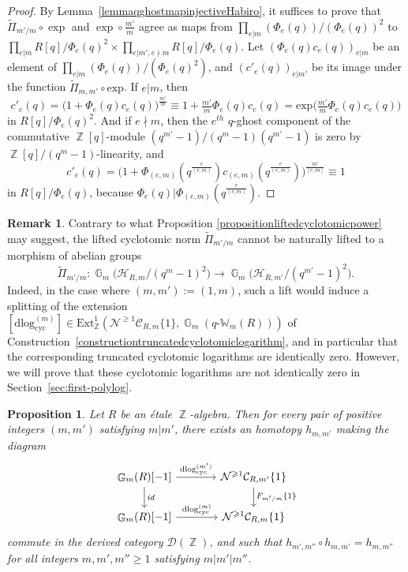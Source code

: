 \documentclass[10pt,twoside]{scrarticle}
\newlength{\mar} \setlength{\mar}{1cm}%
\newlength{\len}
\newtheorem{proposition}[theorem]{Proposition}
\theoremstyle{definition}
\newtheorem{remark}[theorem]{Remark}
\DeclareMathOperator{\Z}{\mathbb{Z}}
\DeclareMathOperator{\G}{\mathbb{G}}
\newcommand{\CRm}{\mathcal{C}_{R,m}}
\newcommand{\Cyc}{\mathrm{cyc}}
\newcommand{\qWm}{q\text{-}\mathbb{W}_m}
\renewcommand{\ge}{\geqslant}
\newcommand{\dlog}{\mathrm{dlog}}
\numberwithin{equation}{theorem}
\begin{document}
\begin{proof}
    By Lemma~\ref{lemmaqghostmapinjectiveHabiro}, it suffices to prove that $\tilde{\Pi}_{m'/m}\circ \exp$ and $\exp\circ \frac{m'}{m}$ agree as maps from $\prod_{e|m}{(\Phi_e(q))/(\Phi_e(q))^2}$ to $\prod_{e|m} R[q]/\Phi_e(q)^2 \times \prod_{e|m',e \nmid m} R[q]/\Phi_e(q)$. 
    Let $(\Phi_e(q)c_e(q))_{e|m}$ be an element of $\prod_{e|m}{(\Phi_e(q))/(\Phi_e(q)^2)}$, and $(c'_e(q))_{e|m'}$ be its image under the function $\tilde{\Pi}_{m,m'} \circ \text{exp}$. If $e|m$, then 
    $$c'_e(q) = \big(1+\Phi_e(q)c_e(q)\big)^{\frac{m'}{m}} \equiv 1 + \tfrac{m'}{m}\Phi_e(q)c_e(q) = \text{exp}\big(\tfrac{m'}{m}\Phi_e(q)c_e(q)\big)$$
    in $R[q]/\Phi_e(q)^2$. 
    And if $e \nmid m$, then the $e^{th}$ $q$-ghost component of the commutative $\Z[q]$-module $(q^{m'}-1)/(q^ m-1)(q^{m'}-1)$ is zero by $\Z[q]/(q^m-1)$-linearity, and 
    $$c'_e(q) = \big(1+\Phi_{(e,m)}(q^{\frac{e}{(e,m)}})c_{(e,m)}(q^{\frac{e}{(e,m)}})\big)^{\frac{m'}{[e,m]}} \equiv 1$$
    in $R[q]/\Phi_e(q)$, because $\Phi_e(q) | \Phi_{(e,m)}(q^{\frac{e}{(e,m)}})$.
\end{proof}

\begin{remark}\label{remarkHabirologarithmcannotexist}
    Contrary to what Proposition \ref{propositionliftedcyclotomicpower} may suggest, the lifted cyclotomic norm $\tilde{\Pi}_{m'/m}$ cannot be naturally lifted to a morphism of abelian groups
    $$\tilde{\Pi}_{m'/m} : \G_m\big(\mathcal{H}_{R,m}/(q^m-1)^2\big) \longrightarrow \G_m\big(\mathcal{H}_{R,m'}/(q^{m'}-1)^2\big).$$
    Indeed, in the case where $(m,m'):=(1,m)$, such a lift would induce a splitting of the extension 
    $[\dlog_{\Cyc}^{(m)}] \in \text{Ext}^1_{\Z}(\mathcal{N}^{\ge 1}\CRm\{1\},\G_m(\qWm(R)))$ 
    of Construction~\ref{constructiontruncatedcyclotomiclogarithm}, and in particular that the corresponding truncated cyclotomic logarithms are identically zero. However, we will prove that these cyclotomic logarithms are not identically zero in Section~\ref{sec:first-polylog}.
\end{remark}

\begin{proposition}\label{propositioncompatiblehomotopies}
    Let $R$ be an étale $\Z$-algebra. Then for every pair of positive integers $(m,m')$ satisfying $m|m'$, there exists an homotopy $h_{m,m'}$ making the diagram
    $$\begin{tikzcd}[column sep=large]
        \G_m(R)[-1] \arrow[d,"\emph{id}"] \arrow[r,"\dlog_{\Cyc}^{(m^\prime)}"] & \mathcal{N}^{\ge 1}\mathcal{C}_{R,m'}\{1\} \arrow[d,"F_{m'/m}\{1\}"] \\
        \G_m(R)[-1] \arrow[r,"\dlog_{\Cyc}^{(m)}"] & \mathcal{N}^{\ge 1} \CRm\{1\}
    \end{tikzcd}$$
    commute in the derived category $\mathcal{D}(\Z)$, and such that $h_{m',m''} \circ h_{m,m'} = h_{m,m''}$ for all integers $m,m',m'' \ge 1$ satisfying $m|m'|m''$.
\end{proposition}
\end{document}

